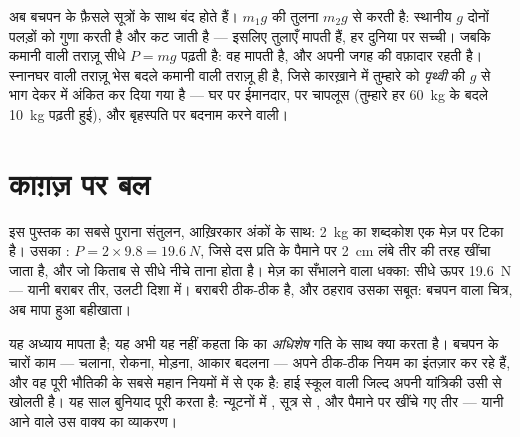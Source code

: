 \begin{remark}[दोनों तराज़ुओं का फ़ैसला, हमेशा के लिए]\label{rem:g9:weight-vs-mass:scales}
अब बचपन के फ़ैसले सूत्रों के साथ बंद होते हैं।  $m_1 g$ की तुलना
$m_2 g$ से करती है: स्थानीय $g$ दोनों पलड़ों को गुणा करती है और कट जाती
है --- इसलिए तुलाएँ \emph{} मापती हैं, हर दुनिया पर सच्ची।
जबकि कमानी वाली तराज़ू सीधे $P = m g$ पढ़ती है: वह \emph{} मापती है,
और अपनी जगह की वफ़ादार रहती है। स्नानघर वाली तराज़ू भेस बदले कमानी वाली
तराज़ू ही है, जिसे कारख़ाने में तुम्हारे  को \emph{पृथ्वी} की $g$ से
भाग देकर  में अंकित कर दिया गया है --- घर पर ईमानदार, 
पर चापलूस (तुम्हारे हर \qty{60}{kg} के बदले \qty{10}{kg} पढ़ती हुई),
और बृहस्पति पर बदनाम करने वाली।
\end{remark}

\section{काग़ज़ पर बल}

\begin{example}[मेज़ पर रखी किताब, न्यूटनों में]\label{ex:g9:weight-vs-mass:book}
इस पुस्तक का सबसे पुराना संतुलन, आख़िरकार अंकों के साथ: \qty{2}{kg} का
शब्दकोश एक मेज़ पर टिका है। उसका : $P = 2 \times 9.8 =
\qty{19.6}{N}$, जिसे दस  प्रति  के पैमाने पर
\qty{2}{cm} लंबे तीर की तरह खींचा जाता है, और जो किताब से सीधे नीचे
ताना होता है। मेज़ का सँभालने वाला धक्का: सीधे ऊपर \qty{19.6}{N} ---
यानी बराबर तीर, उलटी दिशा में। बराबरी ठीक-ठीक है, और ठहराव उसका सबूत:
बचपन वाला चित्र, अब मापा हुआ बहीखाता।
\end{example}

\begin{remark}[बल करते क्या हैं --- वह छूटा हुआ नियम]\label{rem:g9:weight-vs-mass:dynamics}
यह अध्याय  मापता है; यह अभी यह नहीं कहता कि  का \emph{अधिशेष} गति
के साथ क्या करता है। बचपन के चारों काम --- चलाना, रोकना, मोड़ना, आकार
बदलना --- अपने ठीक-ठीक नियम का इंतज़ार कर रहे हैं, और वह पूरी भौतिकी के
सबसे महान नियमों में से एक है: हाई स्कूल वाली जिल्द अपनी यांत्रिकी
उसी से खोलती है। यह साल बुनियाद पूरी करता है: न्यूटनों में , सूत्र से
, और पैमाने पर खींचे गए तीर --- यानी आने वाले उस वाक्य का व्याकरण।
\end{remark}

